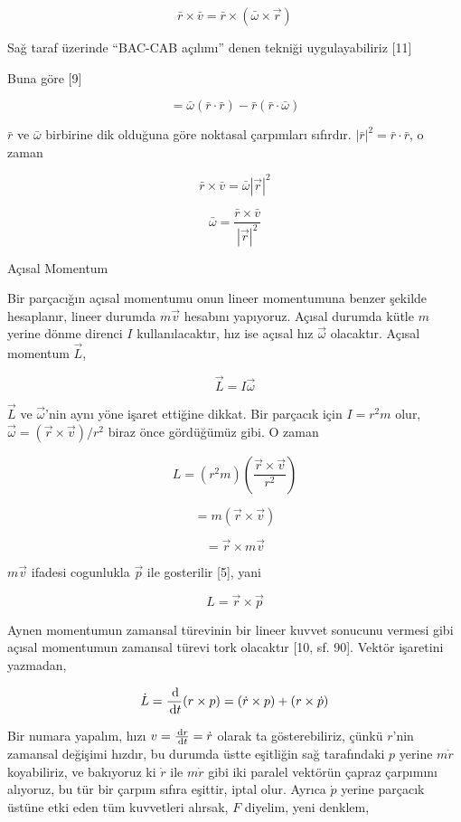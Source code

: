 \documentclass[12pt,fleqn]{article}\usepackage{../../common}
\begin{document}
$$
\bar{r} \times \bar{v} = \bar{r} \times (\bar{\omega} \times \vec{r})
$$

Sağ taraf üzerinde ``BAC-CAB açılımı'' denen tekniği uygulayabiliriz [11]

Buna göre [9]

$$
= \bar{\omega} (\bar{r} \cdot \bar{r}) - \bar{r}(\bar{r} \cdot \bar{\omega})
$$

$\bar{r}$ ve $\bar{\omega}$ birbirine dik olduğuna göre noktasal çarpımları
sıfırdır. $|\bar{r}|^2 = \bar{r} \cdot \bar{r}$, o zaman

$$
\bar{r} \times \bar{v}  = \bar{\omega} |\vec{r}|^2
$$

$$
\bar{\omega}  = \frac{\bar{r} \times \bar{v}}{|\vec{r}|^2} 
$$

Açısal Momentum

Bir parçacığın açısal momentumu onun lineer momentumuna benzer şekilde
hesaplanır, lineer durumda $m \vec{v}$ hesabını yapıyoruz. Açısal durumda kütle
$m$ yerine dönme direnci $I$ kullanılacaktır, hız ise açısal hız $\vec{\omega}$
olacaktır. Açısal momentum $\vec{L}$,

$$
\vec{L} = I \vec{\omega}
$$

$\vec{L}$ ve $\vec{\omega}$'nin aynı yöne işaret ettiğine dikkat. Bir parçacık 
için $I = r^2 m$ olur, $\vec{\omega} = (\vec{r} \times \vec{v}) / r^2$ biraz
önce gördüğümüz gibi. O zaman

$$
L = (r^2 m) \left( \frac{\vec{r} \times \vec{v}}{r^2}  \right)
$$

$$
= m (\vec{r} \times \vec{v})
$$

$$
 = \vec{r} \times m\vec{v}
$$

$m\vec{v}$ ifadesi cogunlukla $\vec{p}$ ile gosterilir [5], yani

$$
L = \vec{r} \times \vec{p}
$$

Aynen momentumun zamansal türevinin bir lineer kuvvet sonucunu vermesi gibi
açısal momentumun zamansal türevi tork olacaktır [10, sf. 90]. Vektör işaretini
yazmadan,

$$
\dot{L} = \frac{\,\mathrm{d} }{\,\mathrm{d} t} (r \times p)  =
(\dot{r} \times p) + (r \times \dot{p})
$$

Bir numara yapalım, hızı $v = \frac{\,\mathrm{d} r}{\,\mathrm{d} t} = \dot{r}$ olarak ta
gösterebiliriz, çünkü $r$'nin zamansal değişimi hızdır, bu durumda üstte
eşitliğin sağ tarafındaki $p$ yerine $m\dot{r}$ koyabiliriz, ve bakıyoruz ki
$\dot{r}$ ile $m\dot{r}$ gibi iki paralel vektörün çapraz çarpımını alıyoruz, bu
tür bir çarpım sıfıra eşittir, iptal olur. Ayrıca $\dot{p}$ yerine parçacık
üstüne etki eden tüm kuvvetleri alırsak, $F$ diyelim, yeni denklem,
\end{document}
